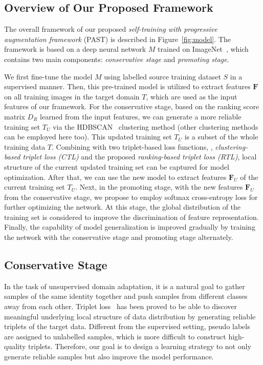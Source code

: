 \documentclass[10pt,twocolumn,letterpaper]{article}
\begin{document}
\subsection{Overview of Our Proposed Framework} 
The overall framework of our proposed \emph{self-training with progressive augmentation framework} (PAST) is described in Figure~\ref{fig:model}. 
The framework is based on a deep neural network $M$ trained on ImageNet~\cite{imagenet}, which contains two main components: \emph{conservative stage} and \emph{promoting stage}. 

We first fine-tune the model $M$ using labelled source training dataset $S$ in a supervised manner. 
Then, this pre-trained model is utilized to extract features $\textbf{F}$ on all training images in the target domain $T$, which are used as the input features of our framework. 
For the conservative stage, based on the ranking score matrix $D_{R}$ learned from the input features, we can generate a more reliable training set $T_{U}$ via the HDBSCAN~\cite{HDBSCAN} clustering method (other clustering methods can be employed here too). 
This updated training set $T_{U}$ is a subset of the whole training data $T$. Combining with two triplet-based loss functions, \ie, \emph{clustering-based triplet loss (CTL)} and the proposed \emph{ranking-based triplet loss (RTL)}, local structure of the current updated training set can be captured for model optimization. 
After that, we can use the new model to extract features $\textbf{F}_{U}$ of the current training set $T_{U}$.
Next, in the promoting stage, with the new features $\textbf{F}_{U}$ from the conservative stage, we propose to employ softmax cross-entropy loss for further optimizing the network. 
At this stage, the global distribution of the training set is considered to improve the discrimination of feature representation.
Finally, the capability of model generalization is improved gradually by training the network with the conservative stage and promoting stage alternately.

\subsection{Conservative Stage}
In the task of unsupervised domain adaptation, it is a natural goal to gather samples of the same identity together and push samples from different classes away from each other. 
Triplet loss~\cite{HHL, theory, tfusion} has been proved to be able to discover meaningful underlying local structure of data distribution by generating reliable triplets of the target data. 
Different from the supervised setting, pseudo labels are assigned to unlabelled samples, which is more difficult to construct high-quality triplets. 
Therefore, our goal is to design a learning strategy to not only generate reliable samples but also improve the model performance. 
\end{document}
